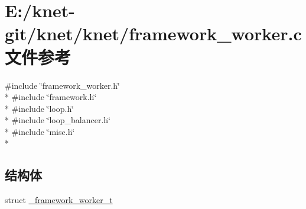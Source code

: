 \hypertarget{a00053}{}\section{E\+:/knet-\/git/knet/knet/framework\+\_\+worker.c 文件参考}
\label{a00053}
{\ttfamily \#include \char`\"{}framework\+\_\+worker.\+h\char`\"{}}\\*
{\ttfamily \#include \char`\"{}framework.\+h\char`\"{}}\\*
{\ttfamily \#include \char`\"{}loop.\+h\char`\"{}}\\*
{\ttfamily \#include \char`\"{}loop\+\_\+balancer.\+h\char`\"{}}\\*
{\ttfamily \#include \char`\"{}misc.\+h\char`\"{}}\\*
\subsection*{结构体}
\begin{DoxyCompactItemize}
\item 
struct \hyperlink{a00012}{\+\_\+framework\+\_\+worker\+\_\+t}
\end{DoxyCompactItemize}
